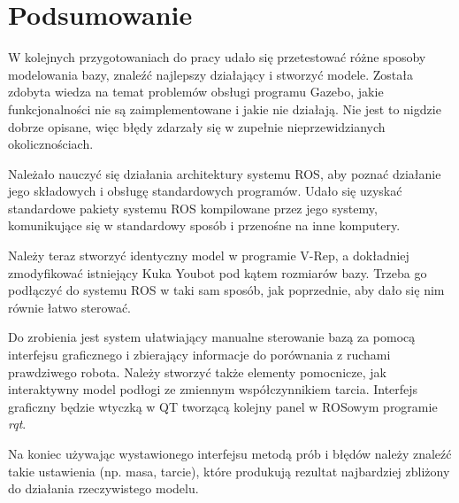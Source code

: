 
\section{Podsumowanie}
W kolejnych przygotowaniach do pracy udało się przetestować różne sposoby modelowania bazy, znaleźć najlepszy działający i stworzyć modele.
Została zdobyta wiedza na temat problemów obsługi programu Gazebo, jakie funkcjonalności nie są zaimplementowane i jakie nie działają.
Nie jest to nigdzie dobrze opisane, więc błędy zdarzały się w zupełnie nieprzewidzianych okolicznościach.

Należało nauczyć się działania architektury systemu ROS, aby poznać działanie jego składowych i obsługę standardowych programów.
Udało się uzyskać standardowe pakiety systemu ROS kompilowane przez jego systemy, komunikujące się w standardowy sposób i przenośne na inne komputery.

Należy teraz stworzyć identyczny model w programie V-Rep, a dokładniej zmodyfikować istniejący Kuka Youbot pod kątem rozmiarów bazy.
Trzeba go podłączyć do systemu ROS w taki sam sposób, jak poprzednie, aby dało się nim równie łatwo sterować.

Do zrobienia jest system ułatwiający manualne sterowanie bazą za pomocą interfejsu graficznego i zbierający informacje do porównania z ruchami prawdziwego robota.
Należy stworzyć także elementy pomocnicze, jak interaktywny model podłogi ze zmiennym współczynnikiem tarcia.
Interfejs graficzny będzie wtyczką w QT tworzącą kolejny panel w ROSowym programie \emph{rqt}.

Na koniec używając wystawionego interfejsu metodą prób i błędów należy znaleźć takie ustawienia (np. masa, tarcie), które produkują rezultat najbardziej zbliżony do działania rzeczywistego modelu.

